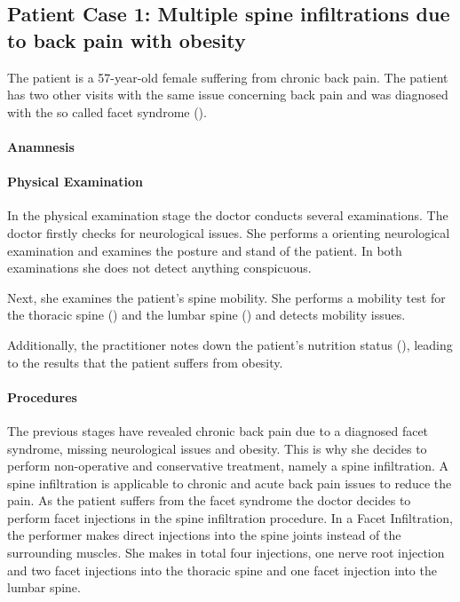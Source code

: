 \subsection{Patient Case 1: Multiple spine infiltrations due to back pain with obesity}\label{subsec:patient-a---multiple-spine-infiltrations-due-to-backpain-with-obesity}
The patient is a 57-year-old female suffering from chronic back pain.
The patient has two other visits with the same issue concerning back pain and was diagnosed with the so called facet syndrome ().

\paragraph{Anamnesis}


\paragraph{Physical Examination}
In the physical examination stage the doctor conducts several examinations.
The doctor firstly checks for neurological issues.
She performs a orienting neurological examination and examines the posture and stand of the patient.
In both examinations she does not detect anything conspicuous.

Next, she examines the patient's spine mobility.
She performs a mobility test for the thoracic spine () and the lumbar spine () and detects mobility issues.


Additionally, the practitioner notes down the patient's nutrition status (), leading to the results that the patient suffers from obesity.

\paragraph{Procedures}

The previous stages have revealed chronic back pain due to a diagnosed facet syndrome, missing neurological issues and obesity.
This is why she decides to perform non-operative and conservative treatment, namely a spine infiltration.
A spine infiltration is applicable to chronic and acute back pain issues to reduce the pain.
As the patient suffers from the facet syndrome the doctor decides to perform facet injections in the spine infiltration procedure.
In a Facet Infiltration, the performer makes direct injections into the spine joints instead of the surrounding muscles.
She makes in total four injections, one nerve root injection and two facet injections into the thoracic spine and one facet injection into the lumbar spine.

